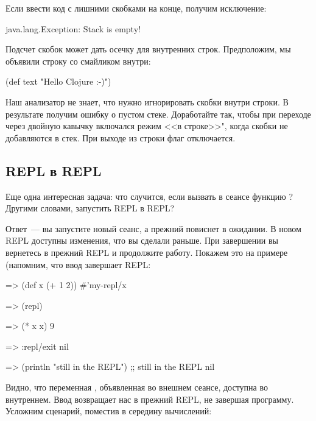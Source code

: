 Если ввести код с лишними скобками на конце, получим исключение:

\begin{english}
  \begin{text}
java.lang.Exception: Stack is empty!
  \end{text}
\end{english}

Подсчет скобок может дать осечку для внутренних строк. Предположим, мы объявили строку со смайликом внутри:

\begin{english}
  \begin{clojure}
(def text "Hello Clojure :-)")
  \end{clojure}
\end{english}

Наш анализатор не знает, что нужно игнорировать скобки внутри строки. В результате получим ошибку о пустом стеке. Доработайте  так, чтобы при переходе через двойную кавычку включался режим <<в строке>>", когда скобки не добавляются в стек. При выходе из строки флаг отключается.

\subsection{REPL в REPL}

Еще одна интересная задача: что случится, если вызвать в сеансе функцию ? Другими словами, запустить REPL в REPL?

Ответ~--- вы запустите новый сеанс, а прежний повиснет в ожидании. В новом REPL доступны изменения, что вы сделали раньше. При завершении вы вернетесь в прежний REPL и продолжите работу. Покажем это на примере (напомним, что ввод  завершает REPL:

\begin{english}
  \begin{clojure}
=> (def x (+ 1 2))
#'my-repl/x

=> (repl)

=> (* x x)
9

=> :repl/exit
nil

=> (println "still in the REPL")
;; still in the REPL
nil
  \end{clojure}
\end{english}

Видно, что переменная , объявленная во внешнем сеансе, доступна во внутреннем. Ввод  возвращает нас в прежний REPL, не завершая программу. Усложним сценарий, поместив  в середину вычислений:


